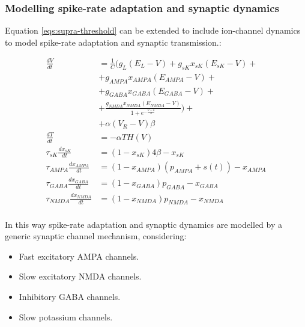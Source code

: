 		\subsubsection{Modelling spike-rate adaptation and synaptic dynamics}
		Equation \ref{eqs:supra-threshold} can be extended to include ion-channel dynamics to model spike-rate adaptation and synaptic transmission.:

		\begin{equation}
			\begin{aligned}
				\frac{dV}{dt} &= \frac{1}{C}\biggl(g_L(E_L-V)+g_{sK}x_{sK}(E_{sK}-V) +\\
				& +g_{\scriptscriptstyle{AMPA}}x_{\scriptscriptstyle{AMPA}}(E_{\scriptscriptstyle{AMPA}}-V) +\\
				& +g_{\scriptscriptstyle{GABA}}x_{\scriptscriptstyle{GABA}}(E_{\scriptscriptstyle{GABA}}-V) +\\
				& +\frac{g_{\scriptscriptstyle{NMDA}}x_{\scriptscriptstyle{NMDA}}(E_{\scriptscriptstyle{NMDA}}-V)}{1+e^{-\frac{V-a}{b}}}\biggr)+\\
				& + \alpha(V_R-V)\beta\\
				\frac{dT}{dt} &= -\alpha TH(V)\\
				\tau_{sK}\frac{dx_{sK}}{dt} &= (1-x_{sK})4\beta-x_{sK}\\
				\tau_{\scriptscriptstyle{AMPA}}\frac{dx_{\scriptscriptstyle{AMPA}}}{dt} &= (1-x_{\scriptscriptstyle{AMPA}})(p_{\scriptscriptstyle{AMPA}}+s(t))-x_{\scriptscriptstyle{AMPA}}\\
				\tau_{\scriptscriptstyle{GABA}}\frac{dx_{\scriptscriptstyle{GABA}}}{dt} &= (1-x_{\scriptscriptstyle{GABA}})p_{\scriptscriptstyle{GABA}}-x_{\scriptscriptstyle{GABA}}\\
				\tau_{\scriptscriptstyle{NMDA}}\frac{dx_{\scriptscriptstyle{NMDA}}}{dt} &= (1-x_{\scriptscriptstyle{NMDA}})p_{\scriptscriptstyle{NMDA}}-x_{\scriptscriptstyle{NMDA}}\\
				\label{eqs:synaptic-dynamics}
			\end{aligned}
		\end{equation}

		In this way spike-rate adaptation and synaptic dynamics are modelled by a generic synaptic channel mechanism, considering:

		\begin{itemize}
			\item Fast excitatory AMPA channels.
			\item Slow excitatory NMDA channels.
			\item Inhibitory GABA channels.
			\item Slow potassium channels.
		\end{itemize}

